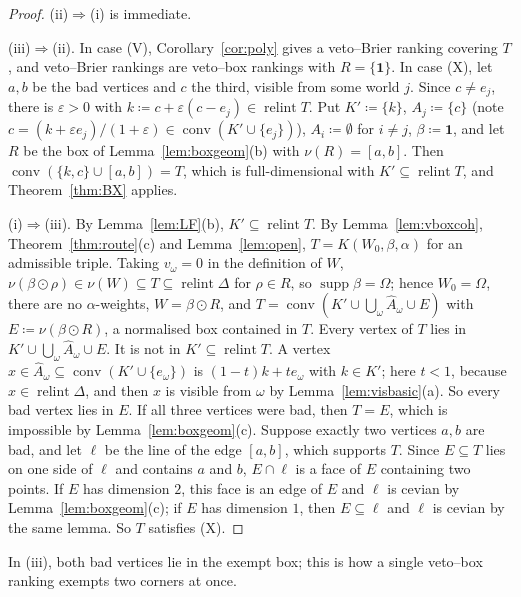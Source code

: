 \documentclass[11pt]{article}
\newcommand{\one}{\mathbf{1}}
\DeclareMathOperator{\conv}{conv}
\DeclareMathOperator{\relint}{relint}
\DeclareMathOperator{\supp}{supp}
\theoremstyle{plain}
\theoremstyle{definition}
\theoremstyle{remark}
\begin{document}
\begin{proof}
(ii)$\Rightarrow$(i) is immediate.

(iii)$\Rightarrow$(ii). In case (V), Corollary~\ref{cor:poly} gives a veto--Brier ranking
covering $T$, and veto--Brier rankings are veto--box rankings with $R=\{\one\}$. In case
(X), let $a,b$ be the bad vertices and $c$ the third, visible from some world $j$. Since
$c\ne e_j$, there is $\varepsilon>0$ with $k\coloneqq c+\varepsilon(c-e_j)\in\relint T$.
Put $K'\coloneqq\{k\}$, $A_j\coloneqq\{c\}$ (note $c=(k+\varepsilon e_j)/(1+\varepsilon)
\in\conv(K'\cup\{e_j\})$), $A_i\coloneqq\emptyset$ for $i\ne j$, $\beta\coloneqq\one$, and
let $R$ be the box of Lemma~\ref{lem:boxgeom}(b) with $\nu(R)=[a,b]$. Then $\conv(\{k,c\}
\cup[a,b])=T$, which is full-dimensional with $K'\subseteq\relint T$, and
Theorem~\ref{thm:BX} applies.

(i)$\Rightarrow$(iii). By Lemma~\ref{lem:LF}(b), $K'\subseteq\relint T$. By
Lemma~\ref{lem:vboxcoh}, Theorem~\ref{thm:route}(c) and Lemma~\ref{lem:open},
$T=K(W_0,\beta,\alpha)$ for an admissible triple. Taking $v_\omega=0$ in the definition of $W$, $\nu(\beta\odot\rho)\in\nu(W)
\subseteq T\subseteq\relint\Delta$ for $\rho\in R$, so $\supp\beta=\Omega$; hence
$W_0=\Omega$, there are no $\alpha$-weights, $W=\beta\odot R$, and $T=\conv(K'\cup
\bigcup_\omega\hat A_\omega\cup E)$ with $E\coloneqq\nu(\beta\odot R)$, a normalised box
contained in $T$. Every vertex of $T$ lies in $K'\cup\bigcup_\omega\hat A_\omega\cup E$.
It is not in $K'\subseteq\relint T$. A vertex $x\in\hat A_\omega\subseteq\conv(K'\cup
\{e_\omega\})$ is $(1-t)k+te_\omega$ with $k\in K'$; here $t<1$, because $x\in\relint\Delta$, and then
$x$ is visible from $\omega$ by
Lemma~\ref{lem:visbasic}(a). So every bad vertex lies in $E$. If all three vertices were
bad, then $T=E$, which is impossible by Lemma~\ref{lem:boxgeom}(c). Suppose exactly two
vertices $a,b$ are bad, and let $\ell$ be the line of the edge $[a,b]$, which supports $T$.
Since $E\subseteq T$ lies on one side of $\ell$ and contains $a$ and $b$, $E\cap\ell$ is a
face of $E$ containing two points. If $E$ has dimension $2$, this face is an edge of $E$
and $\ell$ is cevian by Lemma~\ref{lem:boxgeom}(c); if $E$ has dimension $1$, then
$E\subseteq\ell$ and $\ell$ is cevian by the same lemma. So $T$ satisfies (X).
\end{proof}

In (iii), both bad vertices lie in the exempt box; this is how a single veto--box ranking
exempts two corners at once.
\end{document}
